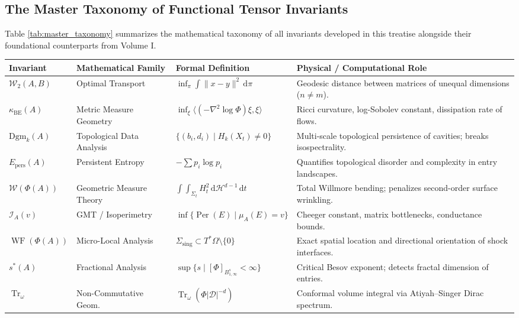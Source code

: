 \documentclass[11pt,a4paper,reqno]{amsart}
\theoremstyle{definition}
\numberwithin{equation}{section}
\newcommand{\Tr}{\operatorname{Tr}}
\newcommand{\Per}{\operatorname{Per}}
\newcommand{\dif}{\,\mathrm{d}}
\newcommand{\WF}{\operatorname{WF}}
\begin{document}
\subsection{The Master Taxonomy of Functional Tensor Invariants}
Table \ref{tab:master_taxonomy} summarizes the mathematical taxonomy of all invariants developed in this treatise alongside their foundational counterparts from Volume I.

\begin{table}[h!]
\centering
\small
\renewcommand{\arraystretch}{1.25}
\begin{tabularx}{\textwidth}{@{} l p{2.8cm} p{3.2cm} X @{}}
\toprule
\textbf{Invariant} & \textbf{Mathematical Family} & \textbf{Formal Definition} & \textbf{Physical / Computational Role} \\
\midrule
$\mathcal{W}_2(A, B)$ & Optimal Transport & $\inf_\pi \int \|x-y\|^2 \dif \pi$ & Geodesic distance between matrices of unequal dimensions ($n \ne m$). \\
\midrule
$\kappa_{\mathrm{BE}}(A)$ & Metric Measure Geometry & $\inf_\xi \langle (-\nabla^2 \log \Phi) \xi, \xi \rangle$ & Ricci curvature, log-Sobolev constant, dissipation rate of flows. \\
\midrule
$\mathrm{Dgm}_k(A)$ & Topological Data Analysis & $\{(b_i, d_i) \mid H_k(X_t) \ne 0\}$ & Multi-scale topological persistence of cavities; breaks isospectrality. \\
\midrule
$E_{\mathrm{pers}}(A)$ & Persistent Entropy & $-\sum p_i \log p_i$ & Quantifies topological disorder and complexity in entry landscapes. \\
\midrule
$\mathcal{W}(\Phi(A))$ & Geometric Measure Theory & $\int \int_{\Sigma_t} H_t^2 \dif \mathcal{H}^{d-1} \dif t$ & Total Willmore bending; penalizes second-order surface wrinkling. \\
\midrule
$\mathcal{I}_A(v)$ & GMT / Isoperimetry & $\inf \{ \Per(E) \mid \mu_A(E) = v \}$ & Cheeger constant, matrix bottlenecks, conductance bounds. \\
\midrule
$\WF(\Phi(A))$ & Micro-Local Analysis & $\Sigma_{\mathrm{sing}} \subset T^*\Omega \setminus \{0\}$ & Exact spatial location and directional orientation of shock interfaces. \\
\midrule
$s^*(A)$ & Fractional Analysis & $\sup \{ s \mid [\Phi]_{B^s_{1,\infty}} < \infty \}$ & Critical Besov exponent; detects fractal dimension of entries. \\
\midrule
$\Tr_\omega$ & Non-Commutative Geom. & $\Tr_\omega(\Phi |\mathcal{D}|^{-d})$ & Conformal volume integral via Atiyah--Singer Dirac spectrum. \\

\end{tabularx}
\end{table}
\end{document}
